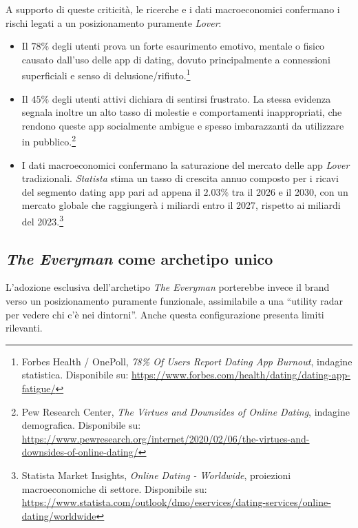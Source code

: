 \documentclass[a4paper, 11pt, table, dvipsnames]{article}
\begin{document}
A supporto di queste criticità, le ricerche e i dati macroeconomici
confermano i rischi legati a un posizionamento puramente \textit{Lover}:

\begin{itemize}
      \item Il $78\%$ degli utenti prova un forte esaurimento emotivo,
            mentale o fisico causato dall'uso delle app di dating,
            dovuto principalmente a connessioni superficiali e senso
            di delusione/rifiuto.\footnote{Forbes Health / OnePoll,
                  \textit{78\% Of Users Report Dating App Burnout}, indagine
                  statistica. Disponibile su: \url{https://www.forbes.com/health/dating/dating-app-fatigue/}}

      \item Il $45\%$ degli utenti attivi dichiara di sentirsi frustrato.
            La stessa evidenza segnala inoltre un alto tasso di molestie
            e comportamenti inappropriati, che rendono queste app
            socialmente ambigue e spesso imbarazzanti da utilizzare
            in pubblico.\footnote{Pew Research Center, \textit{The
                        Virtues and Downsides of Online Dating}, indagine demografica.
                  Disponibile su: \url{https://www.pewresearch.org/internet/2020/02/06/the-virtues-and-downsides-of-online-dating/}}

      \item I dati macroeconomici confermano la saturazione del
            mercato delle app \textit{Lover} tradizionali.
            \textit{Statista} stima un tasso di crescita annuo composto
            per i ricavi del segmento dating app pari ad appena il $2.03\%$
            tra il 2026 e il 2030, con un mercato globale che raggiungerà
            i  miliardi entro il 2027, rispetto ai
             miliardi del 2023.\footnote{Statista Market Insights, \textit{Online
                        Dating - Worldwide}, proiezioni macroeconomiche di settore.
                  Disponibile su: \url{https://www.statista.com/outlook/dmo/eservices/dating-services/online-dating/worldwide}}
\end{itemize}

\subsection{\textit{The Everyman} come archetipo unico}

L'adozione esclusiva dell'archetipo \textit{The Everyman} porterebbe
invece il brand verso un posizionamento puramente funzionale,
assimilabile a una \enquote{utility radar per vedere chi c'è nei dintorni}.
Anche questa configurazione presenta limiti rilevanti.
\end{document}
